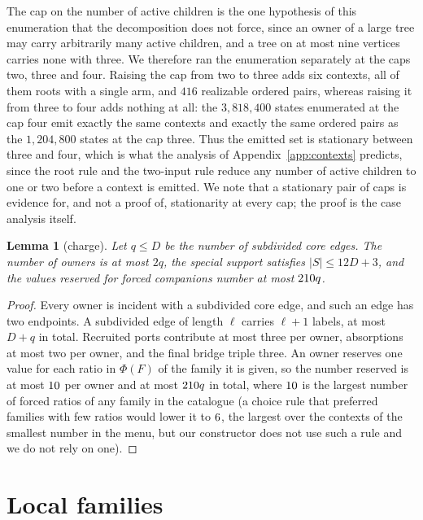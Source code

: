 \documentclass[11pt,a4paper]{article}
\theoremstyle{plain}
\newtheorem{lemma}[theorem]{Lemma}
\theoremstyle{definition}
\theoremstyle{remark}
\begin{document}
The cap on the number of active children is the one hypothesis of this
enumeration that the decomposition does not force, since an owner of a large
tree may carry arbitrarily many active children, and a tree on at most nine
vertices carries none with three.  We therefore ran the enumeration separately
at the caps two, three and four.  Raising the cap from two to three adds six
contexts, all of them roots with a single arm, and $416$ realizable ordered
pairs, whereas raising it from three to four adds nothing at all: the
$3{,}818{,}400$ states enumerated at the cap four emit exactly the same
contexts and exactly the same ordered pairs as the $1{,}204{,}800$ states at
the cap three.  Thus the emitted set is stationary between three and four,
which is what the analysis of Appendix~\ref{app:contexts} predicts, since the
root rule and the two-input rule reduce any number of active children to one
or two before a context is emitted.  We note that a stationary pair of caps is
evidence for, and not a proof of, stationarity at every cap; the proof is the
case analysis itself.

\begin{lemma}[charge]\label{lem:charge}
Let $q\le D$ be the number of subdivided core edges.  The number of owners is
at most $2q$, the special support satisfies $|S|\le 12D+3$, and the values
reserved for forced companions number at most $210 q$.
\end{lemma}

\begin{proof}
Every owner is incident with a subdivided core edge, and such an edge has two
endpoints.  A subdivided edge of length $\ell$ carries $\ell+1$ labels, at
most $D+q$ in total.  Recruited ports contribute at most three per owner,
absorptions at most two per owner, and the final bridge triple three.  An owner
reserves one value for each ratio in $\Phi(F)$ of the family it is given, so
the number reserved is at most $10$ per owner and at most
$210 q$ in total, where $10$ is the largest number of forced
ratios of any family in the catalogue (a choice rule that preferred families
with few ratios would lower it to $6$, the largest over the contexts
of the smallest number in the menu, but our constructor does not use such a
rule and we do not rely on one).
\end{proof}

\section{Local families}\label{sec:cells}
\end{document}
